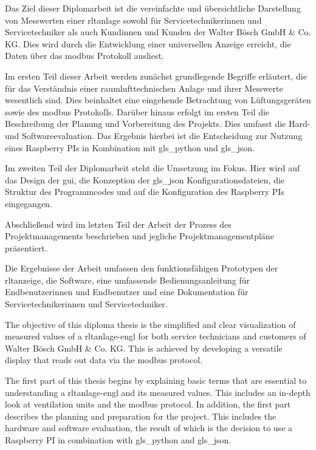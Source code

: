 \noindent Das Ziel dieser Diplomarbeit ist die vereinfachte und übersichtliche Darstellung von Messwerten einer \acf{rltanlage} sowohl für Servicetechnikerinnen und Servicetechniker als auch Kundinnen und Kunden der Walter Bösch GmbH \& Co. KG. Dies wird durch die Entwicklung einer universellen Anzeige erreicht, die Daten über das \gls{modbus} Protokoll ausliest. 

Im ersten Teil dieser Arbeit werden zunächst grundlegende Begriffe erläutert, die für das Verständnis einer raumlufttechnischen Anlage und ihrer Messwerte wesentlich sind. Dies beinhaltet eine eingehende Betrachtung von Lüftungsgeräten sowie des \gls{modbus} Protokolls. Darüber hinaus erfolgt im ersten Teil die Beschreibung der Planung und Vorbereitung des Projekts. Dies umfasst die Hard- und Softwareevaluation. Das Ergebnis hierbei ist die Entscheidung zur Nutzung eines Raspberry PIs in Kombination mit \gls{gls_python} und \gls{gls_json}. 

Im zweiten Teil der Diplomarbeit steht die Umsetzung im Fokus. Hier wird auf das Design der \acf{gui}, die Konzeption der \gls{gls_json} Konfigurationsdateien, die Struktur des Programmcodes und auf die Konfiguration des Raspberry PIs eingegangen. 

Abschließend wird im letzten Teil der Arbeit der Prozess des Projektmanagements beschrieben und jegliche Projektmanagementpläne präsentiert.

Die Ergebnisse der Arbeit umfassen den funktionsfähigen Prototypen der \ac{rltanzeige}, die Software, eine umfassende Bedienungsanleitung für Endbenutzerinnen und Endbenutzer und eine Dokumentation für Servicetechnikerinnen und Servicetechniker.


\noindent The objective of this diploma thesis is the simplified and clear visualization of measured values of a \acf{rltanlage-engl} for both service technicians and customers of Walter Bösch GmbH \& Co. KG. This is achieved by developing a versatile display that reads out data via the \gls{modbus} protocol. 

The first part of this thesis begins by explaining basic terms that are essential to understanding a \ac{rltanlage-engl} and its measured values. This includes an in-depth look at ventilation units and the \gls{modbus} protocol. In addition, the first part describes the planning and preparation for the project. This includes the hardware and software evaluation, the result of which is the decision to use a Raspberry PI in combination with \gls{gls_python} and \gls{gls_json}. 

